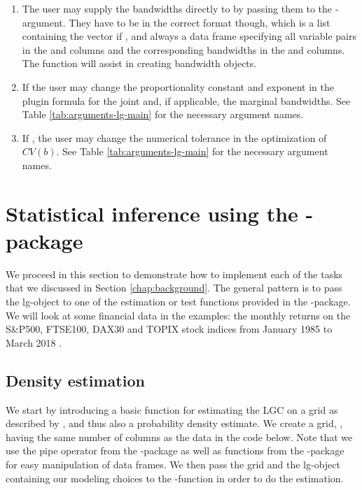 \begin{enumerate}
\def\labelenumi{\arabic{enumi}.}
\item
  The user may supply the bandwidths directly to  by passing them to the -argument. They have to be in the   correct format though, which is a list containing the vector  if , and always a data frame  specifying all variable pairs in the  and  columns and the corresponding bandwidths
  in the  and  columns. The function  will assist in creating bandwidth objects.
\item
  If  the user may change the proportionality constant and exponent in the plugin formula for the joint and, if applicable, the marginal bandwidths. See Table \ref{tab:arguments-lg-main} for the necessary argument names.
\item
  If , the user may change the numerical tolerance in the optimization of \(CV\left(b\right)\). See Table \ref{tab:arguments-lg-main} for the necessary argument names.
\end{enumerate}

\section{Statistical inference using the -package}
\label{chap:inference}

We proceed in this section to demonstrate how to implement each of the tasks that we discussed in Section \ref{chap:background}. The general pattern is to pass the lg-object to one of the estimation or test functions provided in the -package. We will look at some financial data in the examples: the monthly returns on the S\&P500, FTSE100, DAX30 and TOPIX stock indices from January 1985 to March 2018 \citep{datastream}. 

\subsection{Density estimation}\label{chap:density}

We start by introducing a basic function for estimating the LGC on a grid as described by \cite{otne:tjos:2017}, and thus also a probability density estimate. We create a grid, , having the same number of columns as the data in the code below. Note that we use the pipe operator \code{\%\textgreater{}\%} from the -package \citep{bach:wick:2014} as well as functions from the -package \citep{wick:fran:mull:2018} for easy manipulation of data frames. We then pass the grid and the lg-object containing our modeling choices to the -function in order to do the estimation.

